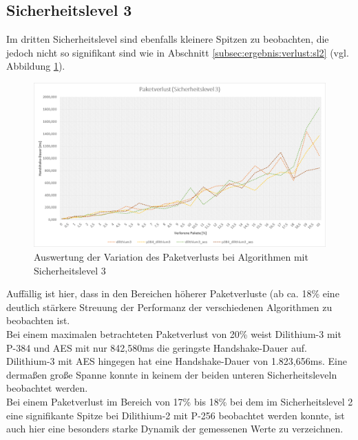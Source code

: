 		\subsection{Sicherheitslevel 3}
		\label{subsec:ergebnis:verlust:sl3}
		
		Im dritten Sicherheitslevel sind ebenfalls kleinere Spitzen zu beobachten, die jedoch nicht so signifikant sind wie in Abschnitt 								\ref{subsec:ergebnis:verlust:sl2} (vgl. Abbildung \ref{fig:ergebnis:verlust:sl3}).
		
		\begin{figure}[htbp]
			\centering
			\includegraphics[width=\textwidth]{../auswertung/verlust_sl3.png}
			\caption{Auswertung der Variation des Paketverlusts bei Algorithmen mit Sicherheitslevel 3}
			\label{fig:ergebnis:verlust:sl3}
		\end{figure}
		
		Auffällig ist hier, dass in den Bereichen höherer Paketverluste (ab ca. 18\% eine deutlich stärkere Streuung der Performanz der verschiedenen 					Algorithmen zu beobachten ist.\\
		
		Bei einem maximalen betrachteten Paketverlust von 20\% weist Dilithium-3 mit P-384 und AES mit nur 842,580ms die 				geringste Handshake-Dauer auf. Dilithium-3 mit AES hingegen hat eine Handshake-Dauer von 1.823,656ms. Eine dermaßen große Spanne konnte in keinem 				der beiden unteren Sicherheitsleveln beobachtet werden.\\
		
		Bei einem Paketverlust im Bereich von 17\% bis 18\% bei dem im Sicherheitslevel 2 eine signifikante Spitze bei Dilithium-2 mit P-256 beobachtet 				werden konnte, ist auch hier eine besonders starke Dynamik der gemessenen Werte zu verzeichnen.\\
		
